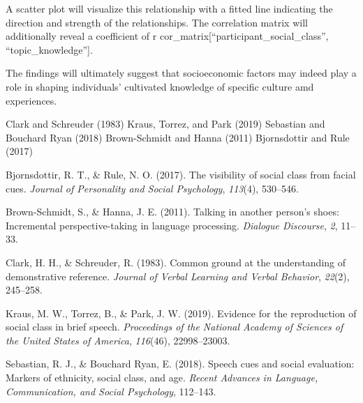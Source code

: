 \documentclass[
  man]{apa6}
\newlength{\cslhangindent}
\newlength{\cslentryspacingunit} %
\newenvironment{CSLReferences}[2] %
 {%
  \setlength{\parindent}{0pt}
  \ifodd #1
  \let\oldpar\par
  \def\par{\hangindent=\cslhangindent\oldpar}
  \fi
  \setlength{\parskip}{#2\cslentryspacingunit}
 }%
 {}
\begin{document}
A scatter plot will visualize this relationship with a fitted line indicating the direction and strength of the relationships. The correlation matrix will additionally reveal a coefficient of r cor\_matrix{[}``participant\_social\_class'', ``topic\_knowledge''{]}.

The findings will ultimately suggest that socioeconomic factors may indeed play a role in shaping individuals' cultivated knowledge of specific culture amd experiences.

Clark and Schreuder (1983)
Kraus, Torrez, and Park (2019)
Sebastian and Bouchard Ryan (2018)
Brown-Schmidt and Hanna (2011)
Bjornsdottir and Rule (2017)

\hypertarget{refs}{}
\begin{CSLReferences}{1}{0}
\leavevmode{}%
Bjornsdottir, R. T., \& Rule, N. O. (2017). The visibility of social class from facial cues. \emph{Journal of Personality and Social Psychology}, \emph{113}(4), 530--546.

\leavevmode{}%
Brown-Schmidt, S., \& Hanna, J. E. (2011). Talking in another person's shoes: {Incremental} perspective-taking in language processing. \emph{Dialogue Discourse}, \emph{2}, 11--33.

\leavevmode{}%
Clark, H. H., \& Schreuder, R. (1983). Common ground at the understanding of demonstrative reference. \emph{Journal of Verbal Learning and Verbal Behavior}, \emph{22}(2), 245--258.

\leavevmode{}%
Kraus, M. W., Torrez, B., \& Park, J. W. (2019). Evidence for the reproduction of social class in brief speech. \emph{Proceedings of the National Academy of Sciences of the United States of America}, \emph{116}(46), 22998--23003.

\leavevmode{}%
Sebastian, R. J., \& Bouchard Ryan, E. (2018). Speech cues and social evaluation: {Markers} of ethnicity, social class, and age. \emph{Recent Advances in Language, Communication, and Social Psychology}, 112--143.

\end{CSLReferences}
\end{document}
